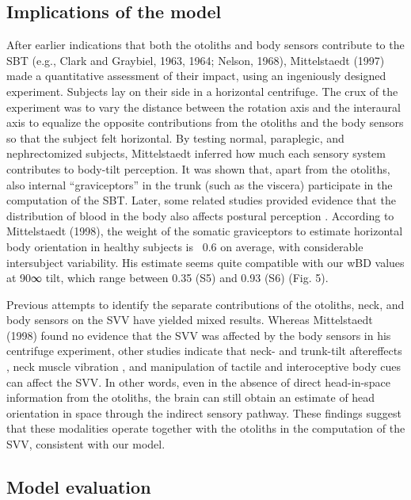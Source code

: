 \subsection{Implications of the model}
 
After earlier indications that both the otoliths and body sensors contribute to the SBT (e.g., Clark and Graybiel, 1963, 1964; Nelson, 1968), Mittelstaedt (1997) made a quantitative assessment of their impact, using an ingeniously designed experiment. Subjects lay on their side in a horizontal centrifuge. The crux of the experiment was to vary the distance between the rotation axis and the interaural axis to equalize the opposite contributions from the otoliths and the body sensors so that the subject felt horizontal. By testing normal, paraplegic, and nephrectomized subjects, Mittelstaedt inferred how much each sensory system contributes to body-tilt perception. It was shown that, apart from the otoliths, also internal ``graviceptors'' in the trunk (such as the viscera) participate in the computation of the SBT. Later, some related studies provided evidence that the distribution of blood in the body also affects postural perception \cite{vaitl1997, vaitl2002}. According to Mittelstaedt (1998), the weight of the somatic graviceptors to estimate horizontal body orientation in healthy subjects is ~0.6 on average, with considerable intersubject variability. His estimate seems quite compatible with our wBD values at 90∞ tilt, which range between 0.35 (S5) and 0.93 (S6) (Fig. 5). 

Previous attempts to identify the separate contributions of the otoliths, neck, and body sensors on the SVV have yielded mixed results. Whereas Mittelstaedt (1998) found no evidence that the SVV was affected by the body sensors in his centrifuge experiment, other studies indicate that neck- and trunk-tilt aftereffects \cite{wade1968}, neck muscle vibration \cite{mckenna2004}, and manipulation of tactile and interoceptive body cues \cite{trousselard2004} can affect the SVV. In other words, even in the absence of direct head-in-space information from the otoliths, the brain can still obtain an estimate of head orientation in space through the indirect sensory pathway. These findings suggest that these modalities operate together with the otoliths in the computation of the SVV, consistent with our model. 


\subsection{Model evaluation}
 
